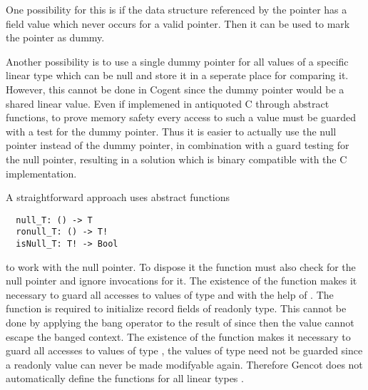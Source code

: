 One possibility for this is if the data structure referenced by the pointer has a field value which never occurs for a valid
pointer. Then it can be used to mark the pointer as dummy.

Another possibility is to use a single dummy pointer for all values of a specific linear type which can be null and store it 
in a seperate place for comparing it. However, this cannot be done in Cogent since the dummy pointer would be a shared linear 
value. Even if implemened in antiquoted C through abstract functions, to prove memory safety every access to such a value must 
be guarded with a test for the dummy pointer. Thus it is easier to actually use the null pointer instead of the dummy pointer,
in combination with a guard testing for the null pointer, resulting in a solution which is binary compatible with the C 
implementation.

A straightforward approach uses abstract functions
\begin{verbatim}
  null_T: () -> T
  ronull_T: () -> T!
  isNull_T: T! -> Bool
\end{verbatim}
to work with the null pointer. To dispose it the function  must also check for the null pointer and ignore
invocations for it. The existence of the function  makes it necessary to guard all accesses to values of type
 and  with the help of . The function  is required to initialize record fields 
of readonly type. This cannot be done by applying the bang operator to the result of  since then the value
cannot escape the banged context. The existence of the function  makes it necessary to guard
all accesses to values of type , the values of type  need not be guarded since a readonly value can never be 
made modifyable again. Therefore Gencot does not automatically define the functions for all 
linear types .


